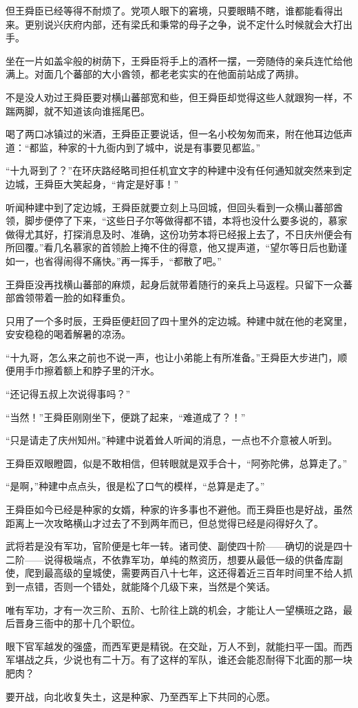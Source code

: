 但王舜臣已经等得不耐烦了。党项人眼下的窘境，只要眼睛不瞎，谁都能看得出来。更别说兴庆府内部，还有梁氏和秉常的母子之争，说不定什么时候就会大打出手。

坐在一片如盖伞般的树荫下，王舜臣将手上的酒杯一摆，一旁随侍的亲兵连忙给他满上。对面几个蕃部的大小酋领，都老老实实的在他面前站成了两排。

不是没人劝过王舜臣要对横山蕃部宽和些，但王舜臣却觉得这些人就跟狗一样，不踹两脚，就不知道该向谁摇尾巴。

喝了两口冰镇过的米酒，王舜臣正要说话，但一名小校匆匆而来，附在他耳边低声道：“都监，种家的十九衙内到了城中，说是有事要见都监。”

“十九哥到了？”在环庆路经略司担任机宜文字的种建中没有任何通知就突然来到定边城，王舜臣大笑起身，“肯定是好事！”

听闻种建中到了定边城，王舜臣就要立刻上马回城，但回头看到一众横山蕃部酋领，脚步便停了下来，“这些日子尔等做得都不错，本将也没什么要多说的，慕家做得尤其好，打探消息及时、准确，这份功劳本将已经报上去了，不日庆州便会有所回覆。”看几名慕家的首领脸上掩不住的得意，他又提声道，“望尔等日后也勤谨如一，也省得闹得不痛快。”再一挥手，“都散了吧。”

王舜臣没再找横山蕃部的麻烦，起身后就带着随行的亲兵上马返程。只留下一众蕃部酋领带着一脸的如释重负。

只用了一个多时辰，王舜臣便赶回了四十里外的定边城。种建中就在他的老窝里，安安稳稳的喝着解暑的凉汤。

“十九哥，怎么来之前也不说一声，也让小弟能上有所准备。”王舜臣大步进门，顺便用手巾擦着额上和脖子里的汗水。

“还记得五叔上次说得事吗？”

“当然！”王舜臣刚刚坐下，便跳了起来，“难道成了？！”

“只是请走了庆州知州。”种建中说着耸人听闻的消息，一点也不介意被人听到。

王舜臣双眼瞪圆，似是不敢相信，但转眼就是双手合十，“阿弥陀佛，总算走了。”

“是啊，”种建中点点头，很是松了口气的模样，“总算是走了。”

王舜臣如今已经是种家的女婿，种家的许多事也不避他。而王舜臣也是好战，虽然距离上一次攻略横山才过去了不到两年而已，但总觉得已经是闷得好久了。

武将若是没有军功，官阶便是七年一转。诸司使、副使四十阶——确切的说是四十二阶——说得极端点，不依靠军功，单纯的熬资历，想要从最低一级的供备库副使，爬到最高级的皇城使，需要两百八十七年，这还得着近三百年时间里不给人抓到一点错，否则一个错处，就能降个几级下来，当然是个笑话。

唯有军功，才有一次三阶、五阶、七阶往上跳的机会，才能让人一望横班之路，最后晋身三衙中的那十几个职位。

眼下官军越发的强盛，而西军更是精锐。在交趾，万人不到，就能扫平一国。而西军堪战之兵，少说也有二十万。有了这样的军队，谁还会能忍耐得下北面的那一块肥肉？

要开战，向北收复失土，这是种家、乃至西军上下共同的心愿。

